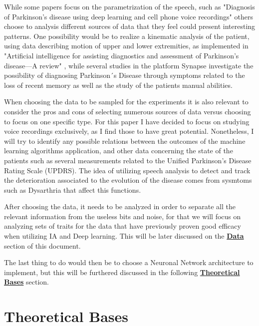 \documentclass[12pt, a4paper]{article}
\begin{document}
	While some papers focus on the parametrization of the speech, such as "Diagnosis of Parkinson's disease using deep learning and cell phone voice recordings" \cite{deeplearningygrabaciones} others choose to analysis different sources of data that they feel could present interesting patterns. One possibility would be to realize a kinematic analysis of the patient, using data describing motion of upper and lower extremities, as implemented in "Artificial intelligence for assisting diagnostics and assessment of Parkinson’s disease—A review" \cite{belic2019artificial}, while several studies in the platform Synapse investigate the possibility of diagnosing Parkinson´s Disease through symptoms related to the loss of recent memory as well as the study of the patients manual abilities.
	
	When choosing the data to be sampled for the experiments it is also relevant to consider the pros and cons of selecting numerous sources of data versus choosing to focus on one specific type. For this paper I have decided to focus on studying voice recordings exclusively, as I find those to have great potential. Nonetheless, I will try to identify any possible relations between the outcomes of the machine learning algorithms application, and other data concerning the state of the patients such as several measurements related to the Unified Parkinson's Disease Rating Scale (UPDRS). The idea of utilizing speech analysis to detect and track the deterioration associated to the evolution of the disease comes from sysmtoms such as Dysarthria that affect this functions. \cite{cnntoformantmeasures}
	
	After choosing the data, it needs to be analyzed in order to separate all the relevant information from the useless bits and noise, for that we will focus on analyzing sets of traits for the data that have previously proven good efficacy when utilizing IA and Deep learning. This will be later discussed on the \hyperref[sec:Data]{\textbf{Data}} section of this document.
	
	The last thing to do would then be to choose a Neuronal Network architecture to implement, but this will be furthered discussed in the following \hyperref[sec:TheoreticalBases]{\textbf{Theoretical Bases}} section.
	
	\clearpage
	
	\section{Theoretical Bases}
	\label{sec:TheoreticalBases}
	
\end{document}
